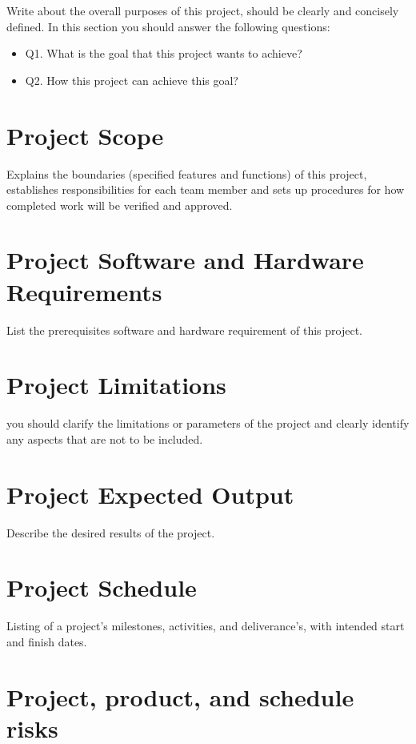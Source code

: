 Write about the overall purposes of this project, should be clearly and concisely defined. In this section you should answer the following questions:

\begin{itemize}
\item Q1. What is the goal that this project wants to achieve?
\item Q2. How this project can achieve this goal? 
\end{itemize}


\section{Project Scope}

Explains the boundaries (specified features and functions) of this project, 
establishes responsibilities for each team member and sets up procedures for how completed work will be verified and approved.

\section{Project Software and Hardware Requirements}

List the prerequisites software and hardware requirement of this project.

\section{Project Limitations}

you should clarify the limitations or parameters of the project and clearly identify any aspects that are not to be included.

\section{Project Expected Output}

Describe the desired results of the project.

\section{Project Schedule}

Listing of a project's milestones, activities, and deliverance's, with intended start and finish dates.

\section{Project, product, and schedule risks}

